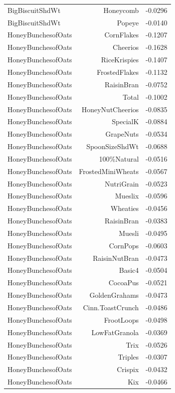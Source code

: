 \begin{longtable}{@{}lrr@{}}
BigBiscuitShdWt & Honeycomb & -0.0296 \\
BigBiscuitShdWt & Popeye & -0.0140 \\
HoneyBunchesofOats & CornFlakes & -0.1207 \\
HoneyBunchesofOats & Cheerios & -0.1628 \\
HoneyBunchesofOats & RiceKrispies & -0.1407 \\
HoneyBunchesofOats & FrostedFlakes & -0.1132 \\
HoneyBunchesofOats & RaisinBran & -0.0752 \\
HoneyBunchesofOats & Total & -0.1002 \\
HoneyBunchesofOats & HoneyNutCheerios & -0.0835 \\
HoneyBunchesofOats & SpecialK & -0.0884 \\
HoneyBunchesofOats & GrapeNuts & -0.0534 \\
HoneyBunchesofOats & SpoonSizeShdWt & -0.0688 \\
HoneyBunchesofOats & 100\%Natural & -0.0516 \\
HoneyBunchesofOats & FrostedMiniWheats & -0.0567 \\
HoneyBunchesofOats & NutriGrain & -0.0523 \\
HoneyBunchesofOats & Mueslix & -0.0596 \\
HoneyBunchesofOats & Wheaties & -0.0456 \\
HoneyBunchesofOats & RaisinBran & -0.0383 \\
HoneyBunchesofOats & Muesli & -0.0495 \\
HoneyBunchesofOats & CornPops & -0.0603 \\
HoneyBunchesofOats & RaisinNutBran & -0.0473 \\
HoneyBunchesofOats & Basic4 & -0.0504 \\
HoneyBunchesofOats & CocoaPus & -0.0521 \\
HoneyBunchesofOats & GoldenGrahams & -0.0473 \\
HoneyBunchesofOats & Cinn.ToastCrunch & -0.0486 \\
HoneyBunchesofOats & FrootLoops & -0.0498 \\
HoneyBunchesofOats & LowFatGranola & -0.0369 \\
HoneyBunchesofOats & Trix & -0.0526 \\
HoneyBunchesofOats & Triples & -0.0307 \\
HoneyBunchesofOats & Crispix & -0.0432 \\
HoneyBunchesofOats & Kix & -0.0466 \\

\end{longtable}
